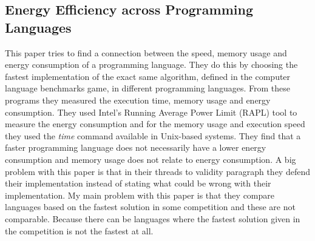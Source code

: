 \subsection{Energy Efficiency across Programming Languages
 \cite{pereira2017energy}}
 This paper tries to find a connection between the speed, memory usage and energy consumption of a programming language. They do this by choosing the fastest implementation of the exact same algorithm, defined in the computer language benchmarks game, in different programming languages. From these programs they measured the execution time, memory usage and energy consumption. They used Intel’s Running Average Power Limit (RAPL) tool to measure the energy consumption and for the memory usage and execution speed they used the \textit{time} command available in Unix-based systems. They find that a faster programming language does not necessarily have a lower energy consumption and memory usage does not relate to energy consumption. A big problem with this paper is that in their threads to validity paragraph they defend their implementation instead of stating what could be wrong with their implementation. My main problem with this paper is that they compare languages based on the fastest solution in some competition and these are not comparable. Because there can be languages where the fastest solution given in the competition is not the fastest at all.